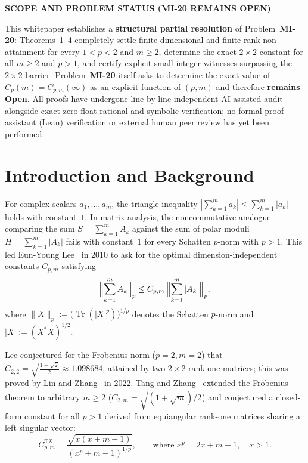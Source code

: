 \documentclass[10pt,letterpaper]{article}
\newcommand{\Tr}{\operatorname{Tr}}
\newcommand{\TZ}{\mathrm{TZ}}
\begin{document}
\begin{tcolorbox}[statusbox]
{\sffamily\footnotesize\bfseries\color{statusborder!90!black}SCOPE AND PROBLEM STATUS (MI-20 REMAINS OPEN)}\par\vspace{1.5pt}
{\small This whitepaper establishes a \textbf{structural partial resolution} of Problem~\textbf{MI-20}: Theorems~1--4 completely settle finite-dimensional and finite-rank non-attainment for every $1 < p < 2$ and $m \ge 2$, determine the exact $2\times 2$ constant for all $m \ge 2$ and $p > 1$, and certify explicit small-integer witnesses surpassing the $2\times 2$ barrier. Problem~\textbf{MI-20} itself asks to determine the exact value of $C_p(m) = C_{p,m}(\infty)$ as an explicit function of $(p,m)$ and therefore \textbf{remains Open}. All proofs have undergone line-by-line independent AI-assisted audit alongside exact zero-float rational and symbolic verification; no formal proof-assistant (Lean) verification or external human peer review has yet been performed.}
\end{tcolorbox}

\section{Introduction and Background}

For complex scalars $a_1,\dots,a_m$, the triangle inequality $|\sum_{k=1}^m a_k| \le \sum_{k=1}^m |a_k|$ holds with constant~$1$. In matrix analysis, the noncommutative analogue comparing the sum $S = \sum_{k=1}^m A_k$ against the sum of polar moduli $H = \sum_{k=1}^m |A_k|$ fails with constant~$1$ for every Schatten $p$-norm with $p > 1$. This led Eun-Young Lee~\cite{Lee2010,Lee2011} in 2010 to ask for the optimal dimension-independent constants $C_{p,m}$ satisfying
\begin{equation}\label{eq:lee}
  \Bigl\|\sum_{k=1}^m A_k\Bigr\|_p \le C_{p,m}\,\Bigl\|\sum_{k=1}^m |A_k|\Bigr\|_p,
\end{equation}
where $\|X\|_p := \bigl(\Tr(|X|^p)\bigr)^{1/p}$ denotes the Schatten $p$-norm and $|X| := (X^* X)^{1/2}$.

Lee conjectured for the Frobenius norm ($p = 2, m = 2$) that $C_{2,2} = \sqrt{\frac{1+\sqrt{2}}{2}} \approx 1.098684$, attained by two $2\times 2$ rank-one matrices; this was proved by Lin and Zhang~\cite{LinZhang2022} in 2022. Tang and Zhang~\cite{TangZhang2026} extended the Frobenius theorem to arbitrary $m \ge 2$ ($C_{2,m} = \sqrt{(1+\sqrt{m})/2}$) and conjectured a closed-form constant for all $p > 1$ derived from equiangular rank-one matrices sharing a left singular vector:
\begin{equation}\label{eq:tz}
  C_{p,m}^{\TZ} = \frac{\sqrt{x(x + m - 1)}}{(x^p + m - 1)^{1/p}},
  \qquad \text{where } x^p = 2x + m - 1,\quad x > 1.
\end{equation}
\end{document}
